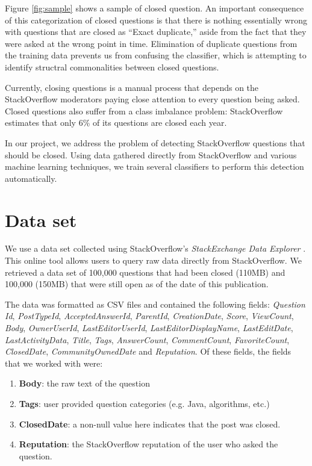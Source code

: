 \documentclass[11pt]{article}
\begin{document}
 Figure \ref{fig:sample} shows a sample of closed question. An important consequence of this categorization of closed questions is that there is nothing essentially wrong with questions that are closed as ``Exact duplicate,'' aside from the fact that they were asked at the wrong point in time. Elimination of duplicate questions from the training data prevents us from confusing the classifier, which is attempting to identify structral commonalities between closed questions.

 Currently, closing questions is a manual process that
depends on the StackOverflow moderators paying close attention to every
question being asked. Closed questions also suffer from a class imbalance problem:
StackOverflow estimates that only 6\% of its questions are closed each
year.

 In our project, we address the problem of detecting StackOverflow
questions that should be closed.  Using data gathered directly from
StackOverflow and various machine learning techniques, we train several classifiers to perform this detection automatically.

\section{Data set}
We use a data set collected using
StackOverflow's \emph{StackExchange Data Explorer}
\cite{website:stackexchange}. This online tool
allows users to query raw data directly from
StackOverflow. We retrieved a data set of 100,000 questions that had been closed (110MB) and 
100,000 (150MB) that were still open as of the date of this publication.

The data was formatted as CSV files and contained the following
fields: \emph{Question Id}, \emph{PostTypeId},
\emph{AcceptedAnswerId}, \emph{ParentId}, \emph{CreationDate},
\emph{Score}, \emph{ViewCount}, \emph{Body}, \emph{OwnerUserId},
\emph{LastEditorUserId}, \emph{LastEditorDisplayName},
\emph{LastEditDate}, \emph{LastActivityData}, \emph{Title},
\emph{Tags}, \emph{AnswerCount}, \emph{CommentCount},
\emph{FavoriteCount}, \emph{ClosedDate}, \emph{CommunityOwnedDate} and
\emph{Reputation}. Of these fields, the fields that we worked
with were:

\begin{enumerate}
  \item \textbf{Body}: the raw text of the question
  \item \textbf{Tags}: user provided question categories (e.g. Java,
    algorithms, etc.)
  \item \textbf{ClosedDate}: a non-null value here indicates that the post was
    closed.
    \item \textbf{Reputation}: the StackOverflow reputation of the user who
      asked the question.
\end{enumerate}
\end{document}
